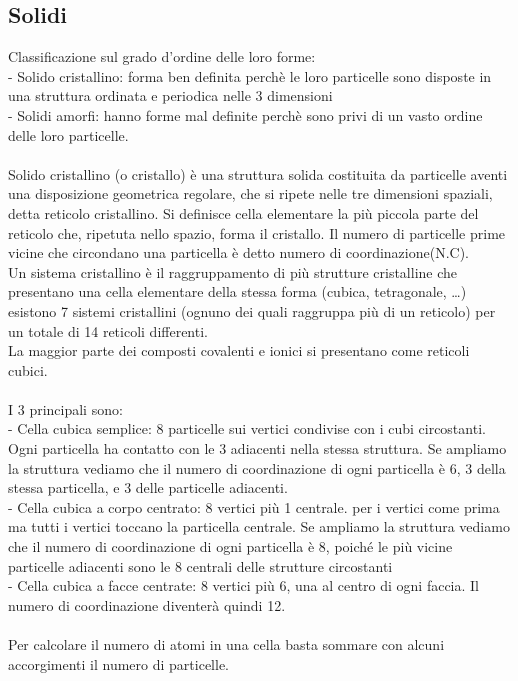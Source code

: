 \subsection{Solidi}
Classificazione sul grado d’ordine delle loro forme:\\
\tab- Solido cristallino: forma ben definita perchè le loro particelle sono disposte in una struttura ordinata e periodica nelle 3 dimensioni\\
\tab- Solidi amorfi: hanno forme mal definite perchè sono privi di un vasto ordine delle loro particelle.\\\\
Solido cristallino (o cristallo) è una struttura solida costituita da particelle aventi una disposizione geometrica regolare, che si ripete nelle tre dimensioni spaziali, detta reticolo cristallino. Si definisce cella elementare la più piccola parte del reticolo che, ripetuta nello spazio, forma il cristallo. Il numero di particelle prime vicine che circondano una particella è detto numero di coordinazione(N.C). \\
Un sistema cristallino è il raggruppamento di più strutture cristalline che presentano una cella elementare della stessa forma (cubica, tetragonale, …) esistono 7 sistemi cristallini (ognuno dei quali raggruppa più di un reticolo) per un totale di 14 reticoli differenti. \\
La maggior parte dei composti covalenti e ionici si presentano come reticoli cubici.\\\\
I 3 principali sono:\\
\tab- Cella cubica semplice: 8 particelle sui vertici condivise con i cubi circostanti. Ogni particella ha contatto con le 3 adiacenti nella stessa struttura. Se ampliamo la struttura vediamo che il numero di coordinazione di ogni particella è 6, 3 della stessa particella, e 3 delle particelle adiacenti.\\
\tab- Cella cubica a corpo centrato: 8 vertici più 1 centrale. per i vertici come prima ma tutti i vertici toccano la particella centrale. Se ampliamo la struttura vediamo che il numero di coordinazione  di ogni particella è 8, poiché le più vicine particelle adiacenti sono le 8 centrali delle strutture circostanti\\
\tab- Cella cubica a facce centrate: 8 vertici più 6, una al centro di ogni faccia. Il numero di coordinazione  diventerà quindi 12. \\\\
Per calcolare il numero di atomi in una cella basta sommare con alcuni accorgimenti il numero di particelle.\\
